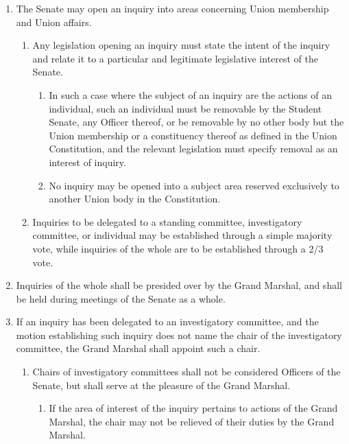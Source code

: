 \documentclass{uniondoc}
\begin{document}

\begin{enumerate}
	\item The Senate may open an inquiry into areas concerning Union membership and Union affairs.
	      \begin{enumerate}
		      \item Any legislation opening an inquiry must state the intent of the inquiry and relate it to a particular and legitimate legislative interest of the Senate.
		            \begin{enumerate}
			            \item In such a case where the subject of an inquiry are the actions of an individual, such an individual must be removable by the Student Senate, any Officer thereof, or be removable by no other body but the Union membership or a constituency thereof as defined in the Union Constitution,
			                  and the relevant legislation must specify removal as an interest of inquiry.
			            \item No inquiry may be opened into a subject area reserved exclusively to another Union body in the Constitution.
		            \end{enumerate}
		      \item Inquiries to be delegated to a standing committee, investigatory committee, or individual may be established through a simple majority vote,
		            while inquiries of the whole are to be established through a 2/3 vote.
	      \end{enumerate}
	\item Inquiries of the whole shall be presided over by the Grand Marshal,
	      and shall be held during meetings of the Senate as a whole.
	\item If an inquiry has been delegated to an investigatory committee, and the motion establishing such inquiry does not name the chair of the investigatory committee, the Grand Marshal shall appoint such a chair.
	      \begin{enumerate}
		      \item Chairs of investigatory committees shall not be considered Officers of the Senate,
		            but shall serve at the pleasure of the Grand Marshal.
		            \begin{enumerate}
			            \item If the area of interest of the inquiry pertains to actions of the Grand Marshal, the chair may not be relieved of their duties by the Grand Marshal.

\end{enumerate}
\end{enumerate}
\end{enumerate}
\end{document}
